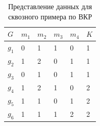 \begin{table}[t!]%
	\centering\small
	\caption{Представление данных для сквозного примера по ВКР \cite{Peskov2004}}%
	\label{tab:ToyCompare-app2}		
	\begin{tabular}{|l|l|l|l|l|l|}
		\hline
		$G$&$m_1$&$m_2$&$m_3$&$m_4$&$K$\\
		\hline
		$g_1$&0&1&1&0&1\\ \hline
		$g_2$&1&2&0&1&1\\ \hline
		$g_3$&0&1&0&1&1\\ \hline
		$g_4$&1&2&1&0&2\\ \hline
		$g_5$&1&1&0&1&2\\ \hline
		$g_6$&1&1&1&2&2\\ \hline		
	\end{tabular}	
	\normalsize%
\end{table}


\NewPage %
